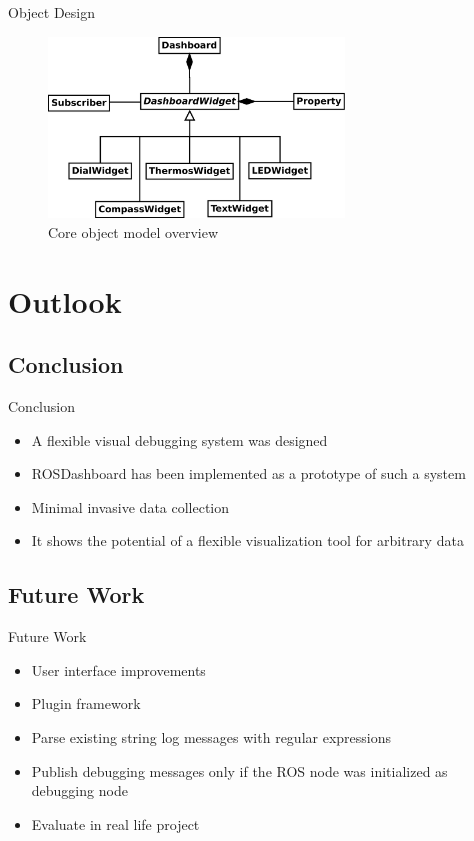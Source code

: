 \documentclass[compress]{beamer}
\begin{document}
\begin{frame}{Object Design}
\begin{figure}
    \centering
    \includegraphics[width=0.7\textwidth]{diagrams/class_overview}
    \caption[Core object model overview]{Core object model overview}
\end{figure}
\end{frame}

\section{Outlook}

\subsection{Conclusion}

\begin{frame}{Conclusion}
\begin{itemize}
\item A flexible visual debugging system was designed
\item ROSDashboard has been implemented as a prototype of such a system
\item Minimal invasive data collection
\item It shows the potential of a flexible visualization tool for arbitrary data
\end{itemize}
\end{frame}

\subsection{Future Work}

\begin{frame}{Future Work}
\begin{itemize}
\item User interface improvements
\item Plugin framework
\item Parse existing string log messages with regular expressions
\item Publish debugging messages only if the ROS node was initialized as debugging node
\item Evaluate in real life project
\end{itemize}
\end{frame}
\end{document}
